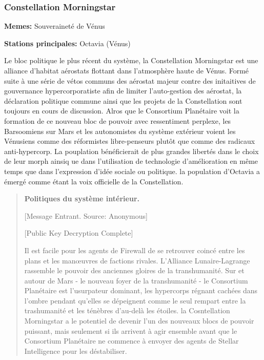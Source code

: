                            \subsubsection{Constellation Morningstar} \label{sec:morn-const} 

                           \textbf{Memes:} Souveraineté de Vénus 

                           \textbf{Stations principales:} Octavia (Vénus) 

                           Le bloc politique le plus récent du système, la Constellation Morningstar est une alliance d'habitat aérostats flottant dans l'atmosphère haute de Vénus. Formé suite à une série de vétos communs des aérostat majeur contre des initaitives de gouvernance hypercorporatiste afin de limiter l'auto-gestion des aérostat, la déclaration politique commune ainsi que les projets de la Constellation sont toujours en cours de discussion. Alros que le Consortium Planétaire voit la formation de ce nouveau bloc de pouvoir avec ressentiment perplexe, les Barsoomiens sur Mars et les autonomistes du système extérieur voient les Vénusiens comme des réformistes libre-penseurs plutôt que comme des radicaux anti-hypercorp. La pouplation bénéficierait de plus grandes libertés dans le choix de leur morph ainsiq ue dans l'utilisation de technologie d'amélioration en même temps que dans l'expression d'idée sociale ou politique. la population d'Octavia a émergé comme étant la voix officielle de la Constellation. 

                           \begin{quotation} \textbf{Politiques du système intérieur.} 

                              [Message Entrant. Source: Anonymous] 

                              [Public Key Decryption Complete] 

                              Il est facile pour les agents de Firewall de se retrouver coincé entre les plans et les manœuvres de factions rivales. L'Alliance Lunaire-Lagrange rassemble le pouvoir des anciennes gloires de la transhumanité. Sur et autour de Mars - le nouveau foyer de la transhumanité - le Consortium Planétaire est l'usurpateur dominant, les hypercorps régnant cachées dans l'ombre pendant qu'elles se dépeignent comme le seul rempart entre la trashumanité et les ténèbres d'au-delà les étoiles. la Cosntellation Morningstar a le potentiel de devenir l'un des nouveaux blocs de pouvoir puissant, mais seulement si ils arrivent à agir ensemble avant que le Consortium Planétaire ne commence à envoyer des agents de Stellar Intelligence pour les déstabiliser. \end{quotation} 

